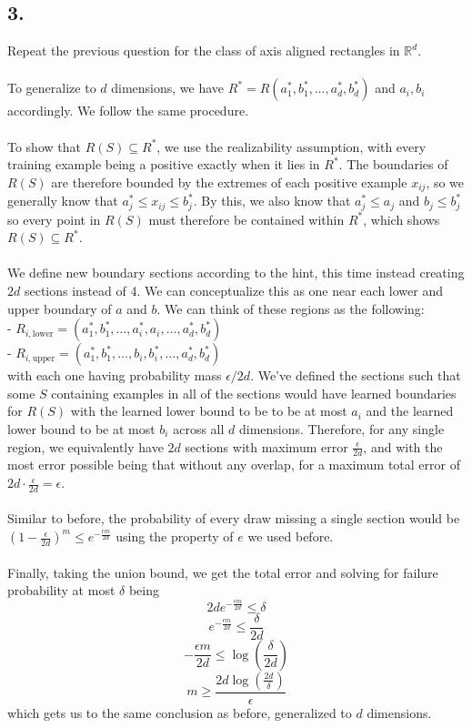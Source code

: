 \documentclass{article}
\begin{document}
{\subsection*{3.}
Repeat the previous question for the class of axis aligned rectangles in \(\mathbb{R}^d\). \\ \\
To generalize to \(d\) dimensions, we have \(R^* = R(a_1^*, b_1^*, \dots, a_d^*, b_d^*)\) and \(a_i, b_i\) accordingly. We follow the same procedure. \\ \\
To show that \(R(S) \subseteq R^*\), we use the realizability assumption, with every training example being a positive exactly when it lies in \(R^*\). The boundaries of \(R(S)\) are therefore bounded by the extremes of each positive example \(x_{ij}\), so we generally know that \(a_j^* \leq x_{ij} \leq b_j^*\). By this, we also know that \(a_j^* \leq a_j\) and  \(b_j \leq b_j^*\) so every point in \(R(S)\) must therefore be contained within \(R^*\), which shows \(R(S) \subseteq R^*\). \\ \\
We define new boundary sections according to the hint, this time instead creating \(2d\) sections instead of 4. We can conceptualize this as one near each lower and upper boundary of \(a\) and \(b\). We can think of these regions as the following: \\
- \(R_{i, \text{lower}} = (a_1^*, b_1^*, \dots, a_i^*, a_i, \dots, a_d^*, b_d^*)\) \\
- \(R_{i, \text{upper}} = (a_1^*, b_1^*, \dots, b_i, b_i^*, \dots, a_d^*, b_d^*)\) \\ 
with each one having probability mass \( \epsilon / 2d\). We've defined the sections such that some \(S\) containing examples in all of the sections would have learned boundaries for \(R(S)\) with the learned lower bound to be to be at most \(a_i\) and the learned lower bound to be at most \(b_i\) across all \(d\) dimensions. Therefore, for any single region, we equivalently have \(2d\) sections with maximum error \(\frac{\epsilon}{2d}\), and with the most error possible being that without any overlap, for a maximum total error of \(2d \cdot \frac{\epsilon}{2d} = \epsilon\). \\ \\
Similar to before, the probability of every draw missing a single section would be \((1 - \frac{\epsilon}{2d})^m \leq e^{-\frac{\epsilon m}{2d}}\) using the property of \(e\) we used before. \\ \\
Finally, taking the union bound, we get the total error and solving for failure probability at most \(\delta\) being
\[
  2d e^{-\frac{\epsilon m}{2d}} \leq \delta 
\]
\[
  e^{-\frac{\epsilon m}{2d}} \leq \frac{\delta}{2d}
\]
\[
  -\frac{\epsilon m}{2d} \leq \log(\frac{\delta}{2d})
\]
\[
  m \geq \frac{2d \log(\frac{2d}{\delta})}{\epsilon}
\]
which gets us to the same conclusion as before, generalized to \(d\) dimensions.

}
\end{document}
